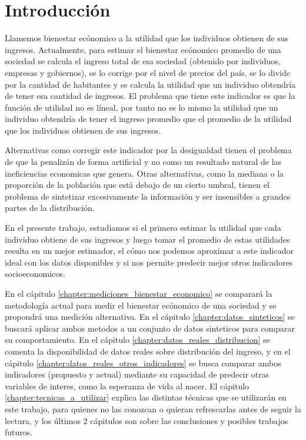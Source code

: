 \chapter{Introducción}

Llamemos bienestar ecónomico a la utilidad que los individuos obtienen de sus ingresos. Actualmente, para estimar el bienestar ecónomico promedio de una sociedad se calcula el ingreso total de esa sociedad (obtenido por individuos, empresas y gobiernos), se lo corrige por el nivel de precios del país, se lo divide por la cantidad de habitantes y se calcula la utilidad que un individuo obtendría de tener esa cantidad de ingresos. El problema que tiene este indicador es que la función de utilidad no es líneal, por tanto no es lo mismo la utilidad que un individuo obtendría de tener el ingreso promedio que el promedio de la utilidad que los individuos obtienen de sus ingresos. 

Alternativas como corregir este indicador por la desigualdad tienen el problema de que la penalizán de forma artificial y no como un resultado natural de las ineficiencias economicas que genera. Otras alternativas, como la mediana o la proporción de la población que está debajo de un cierto umbral, tienen el problema de sintetizar excesivamente la información y ser insensibles a grandes partes de la distribución.

En el presente trabajo, estudiamos si el primero estimar la utilidad que cada individuo obtiene de sus ingresos y luego tomar el promedio de estas utilidades resulta en un mejor estimador, el cómo nos podemos aproximar a este indicador ideal con los datos disponibles y si nos permite predecir mejor otros indicadores socioeconomicos.

En el cápitulo \ref{chapter:mediciones_bienestar_economico} se comparará la metodología actual para medir el bienestar ecónomico de una sociedad y se propondrá una medición alternativa. En el cápitulo \ref{chapter:datos_sinteticos} se buscará aplicar ambos metodos a un conjunto de datos sinteticos para comparar su comportamiento. En el cápitulo \ref{chapter:datos_reales_distribucion} se comenta la disponibilidad de datos reales sobre distribución del ingreso, y en el cápitulo \ref{chapter:datos_reales_otros_indicadores} se busca comparar ambos indicadores (propuesto y actual) mediante su capacidad de predecir otras variables de interes, como la esperanza de vida al nacer. El cápitulo \ref{chapter:tecnicas_a_utilizar} explica las distintas técnicas que se utilizarán en este trabajo, para quienes no las conozcan o quieran refrescarlas antes de seguir la lectura, y los últimos 2 cápitulos son sobre las conclusiones y posibles trabajos futuros.

